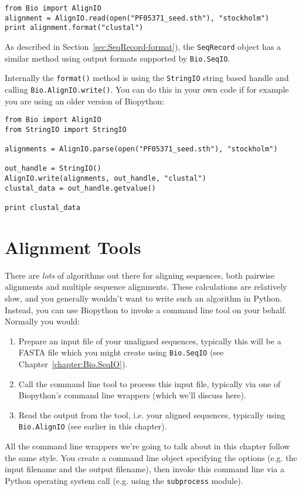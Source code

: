 \documentclass{report}
\begin{document}
\begin{verbatim}
from Bio import AlignIO
alignment = AlignIO.read(open("PF05371_seed.sth"), "stockholm")
print alignment.format("clustal")
\end{verbatim}

As described in Section~\ref{sec:SeqRecord-format}), the \verb|SeqRecord| object has a similar method using output formats supported by \verb|Bio.SeqIO|.

Internally the \verb|format()| method is using the \verb|StringIO| string based handle and calling
\verb|Bio.AlignIO.write()|.  You can do this in your own code if for example you are using an
older version of Biopython:

\begin{verbatim}
from Bio import AlignIO
from StringIO import StringIO

alignments = AlignIO.parse(open("PF05371_seed.sth"), "stockholm")

out_handle = StringIO()
AlignIO.write(alignments, out_handle, "clustal")
clustal_data = out_handle.getvalue()

print clustal_data
\end{verbatim}

\section{Alignment Tools}
\label{sec:alignment-tools}

There are \emph{lots} of algorithms out there for aligning sequences, both pairwise alignments
and multiple sequence alignments. These calculations are relatively slow, and you generally
wouldn't want to write such an algorithm in Python. Instead, you can use Biopython to invoke
a command line tool on your behalf. Normally you would:
\begin{enumerate}
\item Prepare an input file of your unaligned sequences, typically this will be a FASTA file
      which you might create using \verb|Bio.SeqIO| (see Chapter~\ref{chapter:Bio.SeqIO}).
\item Call the command line tool to process this input file, typically via one of Biopython's
      command line wrappers (which we'll discuss here).
\item Read the output from the tool, i.e. your aligned sequences, typically using
      \verb|Bio.AlignIO| (see earlier in this chapter). 
\end{enumerate}

All the command line wrappers we're going to talk about in this chapter follow the same style.
You create a command line object specifying the options (e.g. the input filename and the
output filename), then invoke this command line via a Python operating system call (e.g.
using the \texttt{subprocess} module).
\end{document}
